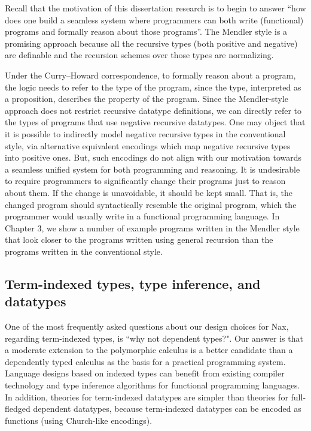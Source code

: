 Recall that the motivation of this dissertation research is to begin to answer
``how does one build a seamless system where programmers can both
write (functional) programs and formally reason about those programs''.
The Mendler style is a promising approach because
all the recursive types (both positive and negative) are definable and
the recursion schemes over those types are normalizing.

Under the Curry--Howard correspondence, to formally reason about a program,
the logic needs to refer to the type of the program, since the type,
interpreted as a proposition, describes the property of the program.
Since the Mendler-style approach does not restrict recursive datatype
definitions, we can directly refer to the types of programs that use
negative recursive datatypes.
One may object that it is possible to
indirectly model negative recursive types in the conventional style,
via alternative equivalent encodings which map negative recursive types
into positive ones. But, such encodings do not align with our motivation
towards a seamless unified system for both programming and reasoning.
It is undesirable to require programmers to significantly change their
programs just to reason about them. If the change is unavoidable, it should
be kept small. That is, the changed program should syntactically resemble
the original program, which the programmer would usually write in
a functional programming language. In Chapter 3, we show a number of example
programs written in the Mendler style that look closer to the programs written
using general recursion than the programs written in the conventional style.

\subsection{Term-indexed types, type inference, and datatypes}
\label{sec:intro:concepts:indexed}
One of the most frequently asked questions about our design choices for Nax,
regarding term-indexed types, is ``why not dependent types?". Our answer
is that a moderate extension to the polymorphic calculus is a better candidate
than a dependently typed calculus as the basis for a practical programming
system.  Language designs based on indexed types can
benefit from existing compiler technology and type inference algorithms
for functional programming languages. In addition, theories for
term-indexed datatypes are simpler than theories for full-fledged
dependent datatypes, because term-indexed datatypes can be encoded as
functions (using Church-like encodings).

